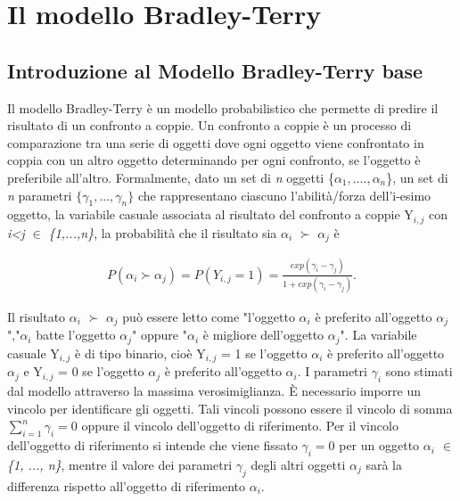 \chapter{Il modello Bradley-Terry}



\section{Introduzione al Modello Bradley-Terry base}
Il modello Bradley-Terry \autocite{bradley1952rank} è un modello probabilistico che permette di predire il risultato di un confronto a coppie. Un confronto a coppie è un processo di comparazione tra una serie di oggetti dove ogni oggetto viene confrontato in coppia con un altro oggetto determinando per ogni confronto, se l'oggetto è preferibile all'altro.
Formalmente, dato un set di \emph{n} oggetti \{$\alpha_{1},....,\alpha_{n}$\}, un set di \emph{n} parametri $ \{\gamma_{1}, ..., \gamma_{n}\}$ che rappresentano ciascuno l'abilità/forza dell'i-esimo oggetto, la variabile casuale associata al risultato del confronto a coppie Y$_{i,j}$ con \emph{i<j $\in$ \{1,...,n\}}, la probabilità che il risultato sia $\alpha_{i}$ $\succ$ $\alpha_{j}$ è

\begin{align} 
	P(\alpha_{i} \succ \alpha_{j}) = P(Y_{i,j} = 1) = \frac{exp(\gamma_{i} - \gamma_{j})}{1 + exp(\gamma_{i} - \gamma_{j})} \label{for:3.1}.
\end{align}

Il risultato $\alpha_{i}$ $\succ$ $\alpha_{j}$ può essere letto come "l'oggetto $\alpha_{i}$ è preferito all'oggetto $\alpha_{j}$","$\alpha_{i}$ batte l'oggetto $\alpha_{j}$" oppure "$\alpha_{i}$ è migliore dell'oggetto $\alpha_{j}$". La variabile casuale Y$_{i,j}$ è di tipo binario, cioè Y$_{i,j}$ = 1 se l'oggetto $\alpha_{i}$ è preferito all'oggetto $\alpha_{j}$ e Y$_{i,j}$ = 0 se l'oggetto $\alpha_{j}$ è preferito all'oggetto $\alpha_{i}$. I parametri $\gamma_{i}$ sono stimati dal modello attraverso la massima verosimiglianza.
È necessario imporre un vincolo per identificare gli oggetti. Tali vincoli possono essere il vincolo di somma $ \sum_{i=1}^{n} \gamma_{i} = 0 $ oppure il vincolo dell'oggetto di riferimento.
Per il vincolo dell'oggetto di riferimento si intende che viene fissato $\gamma_{i} = 0$ per un oggetto \emph{$\alpha_{i}$ $\in$ \{1, ..., n\}}, mentre il valore dei parametri $\gamma_{j}$ degli altri oggetti $\alpha_{j}$ sarà la differenza rispetto all'oggetto di riferimento $\alpha_{i}$.\\


